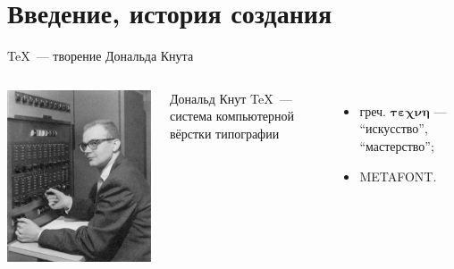 \frame{\titlepage}
{
}

\section{Введение, история создания}

\begin{frame}{\TeX~--- творение Дональда Кнута}
    \begin{columns}
        \centering
        \includegraphics[width=1\linewidth]{../Figures/knut.jpg}

        Дональд Кнут
        \TeX~--- система компьютерной вёрстки типографии
        \begin{itemize}
            \pause\item греч. $\boldsymbol{\tau\varepsilon\chi\nu\eta}$ --- ``искусство'', ``мастерство'';
            \pause\item METAFONT.
        \end{itemize}
    \end{columns}
\end{frame}


